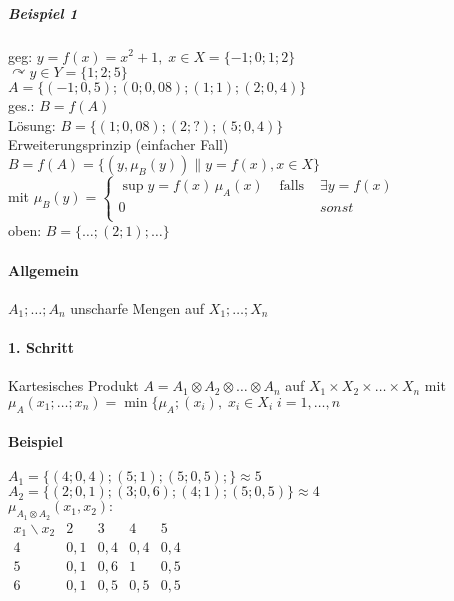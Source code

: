 \documentclass[a4paper]{scrartcl}
\begin{document}
\subparagraph{Beispiel 1} geg: $y= f(x) = x^2 + 1, \; x \in X = \{ -1;0;1;2\}$\\
$\curvearrowright y \in Y = \{1;2;5\}$\\
$A=\{ (-1;0,5);(0;0,08);(1;1);(2;0,4)\}$\\
ges.: $B=f(A)$\\
Lösung: $B=\{ (1;0,08);(2;?);(5;0,4)\}$\\
Erweiterungsprinzip (einfacher Fall)
$B=f(A) = \{(y,\mu_B(y)) \| y = f(x), x \in X \}$\\
mit $\mu_B (y) = \left\{ \begin{array}{lcr} \sup y=f(x)\, \mu_A (x) & \text{ falls } & \exists y = f(x)\\ 0 & & sonst\\ \end{array} \right.$\\
oben: $B = \{ \dots ; (2;1) ; \dots \}$

\paragraph{Allgemein} $A_1; \dots ; A_n $ unscharfe Mengen auf $X_1; \dots ; X_n$

\paragraph{1. Schritt} Kartesisches Produkt $A = A_1 \otimes A_2 \otimes \dots \otimes A_n$ auf $ X_1 \times X_2 \times \dots \times X_n$ mit $\mu_A (x_1;\dots;x_n) = \min \{ \mu_A ; (x_i), \; x_i \in X_i \; i = 1,\dots,n$

\paragraph{Beispiel} $A_1 = \{ (4;0,4);(5;1);(5;0,5);\} \approx 5$\\
$A_2 = \{ (2;0,1); (3;0,6); (4;1); (5;0,5)\} \approx 4$\\

$\mu_{A_1 \otimes A_2} (x_1,x_2) :$\\
$\begin{array}{c|cccc}
x_1 \backslash x_2 & 2 & 3 & 4 & 5\\ \hline
4  & 0,1 & 0,4 & 0,4 & 0,4 \\
5 & 0,1 & 0,6 & 1 & 0,5 \\
6 & 0,1 & 0,5 & 0,5 & 0,5 \\

\end{array}$
\end{document}
